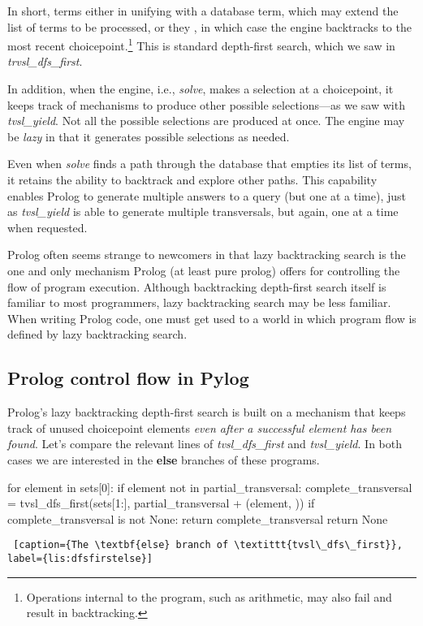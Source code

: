 In short, terms either  in unifying with a database term, which may extend the list of terms to be processed, or they , in which case the engine backtracks to the most recent choicepoint.\footnote{Operations internal to the program, such as arithmetic, may also fail and result in backtracking.} This is standard depth-first search, which we saw in \textit{trvsl\_dfs\_first}. 

In addition, when the engine, i.e., \textit{solve}, makes a selection at a choicepoint, it keeps track of mechanisms to produce other possible selections---as we saw with \textit{tvsl\_yield}. Not all the possible selections are produced at once. The engine may be \textit{lazy} in that it generates possible selections as needed. 

Even when \textit{solve} finds a path through the database that empties its list of terms, it retains the ability to backtrack and explore other paths. This capability enables Prolog to generate multiple answers to a query (but one at a time), just as \textit{tvsl\_yield} is able to generate multiple transversals, but again, one at a time when requested.

Prolog often seems strange to newcomers in that lazy backtracking search is the one and only mechanism Prolog (at least pure prolog) offers for controlling the flow of program execution. Although backtracking depth-first search itself is familiar to most programmers, lazy backtracking search may be less familiar. When writing Prolog code, one must get used to a world in which program flow is defined by lazy backtracking search.

\subsection{Prolog control flow in Pylog}
Prolog's lazy backtracking depth-first search is built on a mechanism that keeps track of unused choicepoint elements \textit{even after a successful element has been found}. Let's compare the relevant lines of \textit{tvsl\_dfs\_first} and \textit{tvsl\_yield}. In both cases we are interested in the \textbf{else} branches of these programs.

\begin{minipage}{\linewidth} \largev   \hrulefill
\begin{python}[numbers=left]
    for element in sets[0]:
      if element not in partial_transversal:
        complete_transversal = tvsl_dfs_first(sets[1:], partial_transversal + (element, ))
        if complete_transversal is not None:
          return complete_transversal 
    return None
\end{python}
\begin{lstlisting} [caption={The \textbf{else} branch of \textittt{tvsl\_dfs\_first}}, label={lis:dfsfirstelse}]
\end{lstlisting}
\end{minipage}



